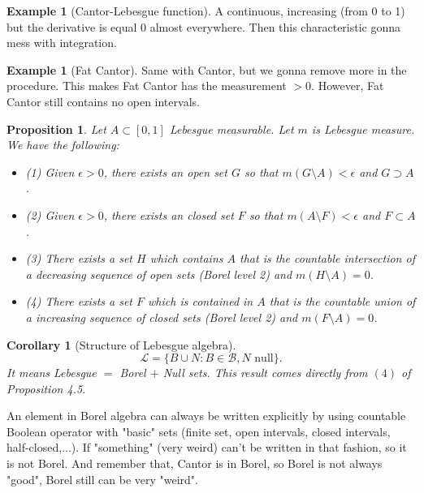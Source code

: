 \documentclass[11pt,a4paper]{article}
\theoremstyle{definition}
\newtheorem{example}[definition]{Example}
\theoremstyle{plain}
\newtheorem{proposition}[definition]{Proposition}
\newtheorem{corollary}[definition]{Corollary}
\begin{document}
\begin{example}[Cantor-Lebesgue function]
A continuous, increasing (from 0 to 1) but the derivative is equal 0 almost everywhere. Then this characteristic gonna mess with integration.
\end{example}

\begin{example}[Fat Cantor]
Same with Cantor, but we gonna remove more in the procedure. This makes Fat Cantor has the measurement $> 0$. However, Fat Cantor still contains no open intervals. 
\end{example}

\begin{proposition}
Let $A \subset [0,1]$ Lebesgue measurable. Let $m$ is Lebesgue measure. We have the following:
\begin{itemize}
    \item (1) Given $\epsilon >0$, there exists an open set $G$ so that $m(G\setminus A) < \epsilon$ and $G \supset A$.
    \item (2) Given $\epsilon >0$, there exists an closed set $F$ so that $m(A\setminus F) < \epsilon$ and $F \subset A$.
    \item (3) There exists a set $H$ which contains $A$ that is the countable intersection of a decreasing sequence of open sets (Borel level 2) and $m(H \setminus A) =0$.
    \item (4) There exists a set $F$ which is contained in $A$ that is the countable union of a increasing sequence of closed sets (Borel level 2) and $m(F \setminus A) =0$.

\end{itemize}
\end{proposition}

\begin{corollary}[Structure of Lebesgue algebra]
\[
\mathcal{L} = \{B \cup N: B\in \mathcal{B}, N \text{ null}\}.
\]
It means Lebesgue $=$ Borel $+$ Null sets. This result comes directly from $(4)$ of Proposition 4.5.
\end{corollary}

\begin{mynote}
An element in Borel algebra can always be written explicitly by using countable Boolean operator with "basic" sets (finite set, open intervals, closed intervals, half-closed,...). If "something" (very weird) can't be written in that fashion, so it is not Borel. And remember that, Cantor is in Borel, so Borel is not always "good", Borel still can be very "weird".
\end{mynote}
\end{document}

